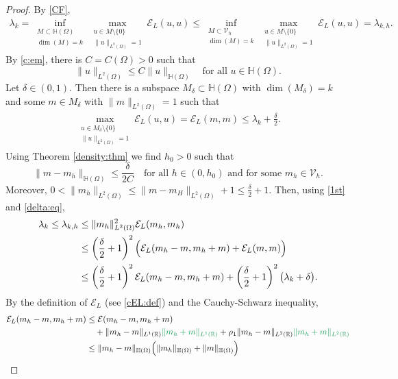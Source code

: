 \documentclass[10 pt]{article}
\numberwithin{equation}{section}
\def\R{\mathbb{R}}
\def\mH{\mathbb{H}}
\newcommand{\SJ}[1]{{\color{ForestGreen} #1}}  %
\begin{document}
\begin{proof}
By \eqref{CF}, 
\begin{align}\label{1st}
\lambda_k=\inf_{\substack{M\subset \mH(\Omega)\\ \dim(M)=k}} \max_{\substack{u\in M\setminus\{0\}\\ \|u\|_{L^2(\Omega)}=1}} \mathcal{E}_L(u,u)\leq \inf_{\substack{M\subset \mathcal{V}_{h}\\ \dim(M)=k}} \max_{\substack{u\in M\setminus\{0\}\\ \|u\|_{L^2(\Omega)}=1}} \mathcal{E}_L(u,u)=\lambda_{k,h}. 
\end{align}
 By \eqref{c:em}, there is $C=C(\Omega)>0$ such that 
$$
\|u\|_{L^2(\Omega)}\leq C\|u\|_{\mH(\Omega)}\quad\text{for all $u\in \mH(\Omega)$.}
$$
Let  \SJ{$\delta\in(0,1)$}. Then there is a subspace $M_{\delta}\subset \mH(\Omega)$ with $\dim(M_{\delta})=k$ and some $m\in M_{\delta}$ with $\|m\|_{L^2(\Omega)}=1$ such that
\begin{align}\label{delta:eq}
\max_{\substack{ u\in M_{\delta}\setminus \{0\}\\ \|u\|_{L^2(\Omega)}=1}} \mathcal{E}_L(u,u)=\mathcal{E}_{L}(m,m)\leq \lambda_k+\frac{\delta}{2}. 
\end{align}
Using Theorem \ref{density:thm} we find $h_0>0$ such that 
$$
\|m-m_h\|_{\mH(\Omega)}\leq \frac{\delta}{2C} \quad\text{for all $h\in(0,h_0)$ and for some $m_h\in {\mathcal V}_h$}.
$$
Moreover, $0<\|m_h\|_{L^2(\Omega)}\leq \|m-m_H\|_{L^2(\Omega)}+1\leq \frac{\delta}{2}+1
$. Then, using \eqref{1st} and \eqref{delta:eq},
\begin{align}
\lambda_{k}\leq \lambda_{k,h}&\leq \|m_h\|_{L^2(\Omega)}^2 \mathcal{E}_L(m_h,m_h)\\
&\leq \left( \frac{\delta}{2}+1\right)^2\Big(\mathcal{E}_L(m_h-m,m_h+m)+\mathcal{E}_L(m,m)\Big)\notag\\
&\leq \left( \frac{\delta}{2}+1\right)^2\mathcal{E}_L(m_h-m,m_h+m)
+\left( \frac{\delta}{2}+1\right)^2\big(\lambda_k+\delta\big).\label{lambda-k-upperbound}
\end{align}
By the definition of $\mathcal{E}_L$ (see \eqref{cEL:def}) and the Cauchy-Schwarz inequality, 
\begin{align}
\mathcal{E}_L(m_h-m,m_h+m)&\leq \mathcal{E}(m_h-m,m_h+m)\\
&\quad +\|m_h-m\|_{L^1(\R)}\SJ{\|m_h+m\|_{L^1(\R)}}+\rho_1\|m_h-m\|_{L^2(\R)}\SJ{\|m_h+m\|_{L^2(\R)}}\notag\\
&\leq \|m_h-m\|_{\mH(\Omega)}\Big(\|m_h\|_{\mH(\Omega)}+\|m\|_{\mH(\Omega)}\Big)\\

\end{align}
\end{proof}
\end{document}
